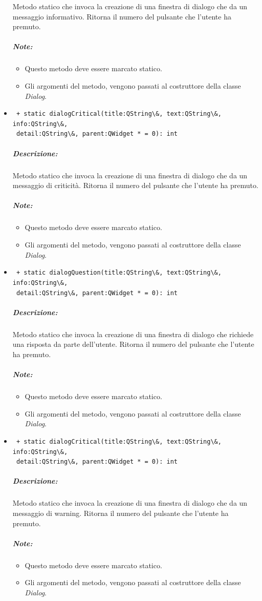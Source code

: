 \begin{itemize}
Metodo statico che invoca la creazione di una finestra di dialogo che da un messaggio informativo. Ritorna il numero del pulsante che l'utente ha premuto. \\
\subparagraph{Note: }
\begin{itemize}
\item Questo metodo deve essere marcato statico.
\item Gli argomenti del metodo, vengono passati al costruttore della classe \emph{Dialog}.
\end{itemize}
\item \color{blue}\verb! + static dialogCritical(title:QString\&, text:QString\&, info:QString\&,! \\ \verb! detail:QString\&, parent:QWidget * = 0): int!
\color{black}
\subparagraph{Descrizione: }
Metodo statico che invoca la creazione di una finestra di dialogo che da un messaggio di criticità. Ritorna il numero del pulsante che l'utente ha premuto. \\
\subparagraph{Note:}
\begin{itemize}
\item Questo metodo deve essere marcato statico.
\item Gli argomenti del metodo, vengono passati al costruttore della classe \emph{Dialog}.
\end{itemize}
\item \color{blue}\verb! + static dialogQuestion(title:QString\&, text:QString\&, info:QString\&,! \\ \verb! detail:QString\&, parent:QWidget * = 0): int!
\color{black}
\subparagraph{Descrizione: }
Metodo statico che invoca la creazione di una finestra di dialogo che richiede una risposta da parte dell'utente. Ritorna il numero del pulsante che l'utente ha premuto. \\
\subparagraph{Note:}
\begin{itemize}
\item Questo metodo deve essere marcato statico.
\item Gli argomenti del metodo, vengono passati al costruttore della classe \emph{Dialog}.
\end{itemize}
\item \color{blue}\verb! + static dialogCritical(title:QString\&, text:QString\&, info:QString\&,! \\ \verb! detail:QString\&, parent:QWidget * = 0): int!
\color{black}
\subparagraph{Descrizione: }
Metodo statico che invoca la creazione di una finestra di dialogo che da un messaggio di warning. Ritorna il numero del pulsante che l'utente ha premuto. \\
\subparagraph{Note:}
\begin{itemize}
\item Questo metodo deve essere marcato statico.
\item Gli argomenti del metodo, vengono passati al costruttore della classe \emph{Dialog}.
\end{itemize}
\end{itemize}
\pagebreak
